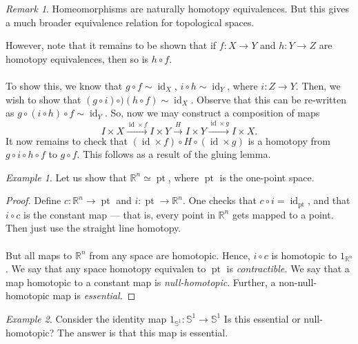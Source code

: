 \documentclass[a4paper]{report}
\theoremstyle{definition}
\theoremstyle{remark}
\newtheorem{remark}{Remark}
\theoremstyle{proposition}
\theoremstyle{conjecture}
\theoremstyle{lemma}
\theoremstyle{corollary}
\theoremstyle{exercise}
\newtheorem{example}{Example}
\newcommand{\on}{\operatorname}
\begin{document}
\begin{remark}
    Homeomorphisms are naturally homotopy equivalences. But this gives a much
    broader equivalence relation for topological spaces. 
\end{remark}
However, note that it remains to be shown that if 
$f : X \to Y$ and $h : Y \to Z$ are homotopy equivalences,
then so is $h \circ f$.\\\\
To show this, we know that $g\circ f \sim \on{id}_X$, $i \circ h \sim \on{id}_Y$,
where $i : Z \to Y$. Then, we wish to show that 
$(g\circ i ) \circ )(h\circ f) \sim \on{id}_X$.
Observe that this can be re-written as $g\circ (i\circ h)\circ f \sim \on{id}_Y$.
So, now we may construct a composition of maps
$$I \times X \stackrel{\on{id} \times f}{\longrightarrow} I \times Y \stackrel{H}{\longrightarrow} I \times Y \stackrel{\on{id} \times g}{\longrightarrow} I \times X.$$
It now remains to check that 
$(\on{id} \times f) \circ H \circ (\on{id} \times g)$ is a homotopy
from $g\circ i \circ h \circ f$ to $g \circ f$.
This follows as a result of the gluing lemma.

\begin{example}
    Let us show that $\mathbb{R}^n \simeq \on{pt}$, where $\on{pt}$ is the 
    one-point space.
\end{example}

\begin{proof}
    Define $c : \mathbb{R}^n \to \on{pt}$ and $i : \on{pt} \to \mathbb{R}^n$. 
    One checks that $c\circ i = \on{id}_{\on{pt}}$, and that 
    $i\circ c$ is the constant 
    map --- that is, every point 
    in $\mathbb{R}^n$ gets mapped to a point. Then just use the straight line homotopy.\\\\
    But all maps to $\mathbb{R}^n$ from any space are homotopic. Hence, $i \circ c$ is homotopic to $1_{\mathbb{R}^n}$. 
    We say that any space homotopy equivalen to $\on{pt}$ is \emph{contractible.}
    We say that a map homotopic to a constant map is \emph{null-homotopic}. Further, a non-null-homotopic map is \emph{essential.}
\end{proof}

\begin{example}
    Consider the identity map
    $1_{\mathbb{S}^1} : \mathbb{S}^1 \to \mathbb{S}^1$ 
    Is this essential or null-homotopic? The answer is that this map is essential.
\end{example}
\end{document}
